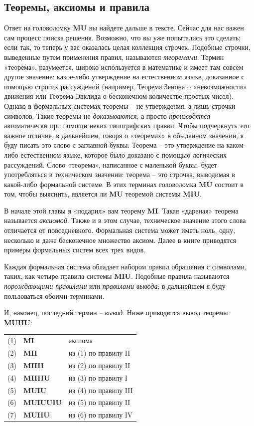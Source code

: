 \documentclass[../main.tex]{subfiles}
\begin{document}
\subsection{Теоремы, аксиомы и правила}

Ответ на головоломку \textbf{MU} вы найдете дальше в тексте.
Сейчас для нас важен сам процесс поиска решения.
Возможно, что вы уже попытались это сделать; если так, то теперь у вас оказалась целая коллекция строчек.
Подобные строчки, выведенные путем применения правил, называются \emph{теоремами}.
Термин «теорема», разумеется, широко используется в математике и имеет там совсем другое значение: какое-либо утверждение на естественном языке, доказанное с помощью строгих рассуждений (например, Теорема Зенона о «невозможности» движения или Теорема Эвклида о бесконечном количестве простых чисел).
Однако в формальных системах теоремы \--- не утверждения, а лишь строчки символов.
Такие теоремы не \emph{доказываются}, а просто \emph{производятся} автоматически при помощи неких типографских правил.
Чтобы подчеркнуть это важное отличие, в дальнейшем, говоря о «теоремах» в обыденном значении, я буду писать это слово с заглавной буквы: Теорема \--- это утверждение на каком-либо естественном языке, которое было доказано с помощью логических рассуждений.
Слово «теорема», написанное с маленькой буквы, будет употребляться в техническом значении: теорема \--- это строчка, выводимая в какой-либо формальной системе.
В этих терминах головоломка \textbf{MU} состоит в том, чтобы выяснить, является ли \textbf{MU} теоремой системы \textbf{MIU}.

В начале этой главы я «подарил» вам теорему \textbf{MI}.
Такая «дареная» теорема называется \emph{аксиомой}.
Также и в этом случае, техническое значение этого слова отличается от повседневного.
Формальная система может иметь ноль, одну, несколько и даже бесконечное множество аксиом.
Далее в книге приводятся примеры формальных систем всех трех видов.

Каждая формальная система обладает набором правил обращения с символами, таких, как четыре правила системы \textbf{MIU}.
Подобные правила называются \emph{порождающими правилами} или \emph{правилами вывода}; в дальнейшем я буду пользоваться обоими терминами.

И, наконец, последний термин \--- \emph{вывод}.
Ниже приводится вывод теоремы \textbf{MUIIU}:

\begin{block}
\begin{tabular}{@{} r @{~} l @{\quad} l @{}}
    (1) & \textbf{MI} & аксиома \\
    (2) & \textbf{MII} & из (1) по правилу II \\
    (3) & \textbf{MIIII} & из (2) по правилу II \\
    (4) & \textbf{MIIIIU} & из (3) по правилу I \\
    (5) & \textbf{MUIU} & из (4) по правилу III \\
    (6) & \textbf{MUIUUIU} & из (5) по правилу II \\
    (7) & \textbf{MUIIU} & из (6) по правилу IV \\
\end{tabular}
\end{block}
\end{document}
